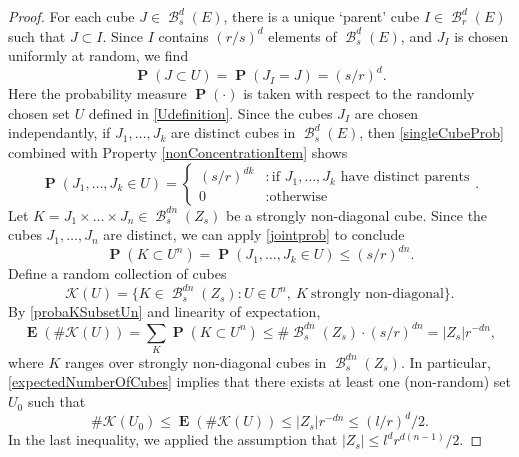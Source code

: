 \documentclass[dvipsnames,letterpaper,12pt]{article}
\numberwithin{equation}{section}
\theoremstyle{plain}
\DeclareMathOperator{\Prob}{\mathbf{P}}
\DeclareMathOperator{\Expect}{\mathbf{E}}
\DeclareMathOperator{\B}{\mathcal{B}}
\begin{document}
\begin{proof}
	For each cube $J \in \B_s^d(E)$, there is a unique `parent' cube $I \in \B_r^d(E)$ such that $J \subset I$. Since $I$ contains $(r/s)^d$ elements of $\B^d_s(E)$, and $J_I$ is chosen uniformly at random, we find
	\begin{equation} \label{singleCubeProb}
		\Prob(J \subset U) = \Prob(J_I = J) = (s/r)^d.
	\end{equation}
	Here the probability measure $\Prob(\cdot)$ is taken with respect to the randomly chosen set $U$ defined in \eqref{Udefinition}. Since the cubes $J_I$ are chosen independantly, if $J_1, \dots, J_k$ are distinct cubes in $\B^d_s(E)$, then \eqref{singleCubeProb} combined with Property \ref{nonConcentrationItem} shows
	\begin{equation}\label{jointprob}
		\Prob(J_1, \dots, J_k \in U) = \begin{cases} (s/r)^{dk} &: \text{if $J_1, \dots, J_k$ have distinct parents} \\ 0 &: \text{otherwise} \end{cases}.
	\end{equation}
	Let $K = J_1 \times \dots \times J_n \in \B^{dn}_s(Z_s)$ be a strongly non-diagonal cube. Since the cubes $J_1, \dots, J_n$ are distinct, we can apply \eqref{jointprob} to conclude
	\begin{equation}\label{probaKSubsetUn}
		\Prob(K \subset U^n) = \Prob(J_1, \dots, J_k \in U) \leq (s/r)^{dn}.
	\end{equation}
	Define a random collection of cubes
	\begin{equation}\label{KUDef}
		\mathcal{K}(U)=\{ K \in \B_s^{dn}(Z_s) \colon U\in U^n,\ K\ \textrm{strongly non-diagonal}  \}.
	\end{equation}
	By \eqref{probaKSubsetUn} and linearity of expectation,
	\begin{equation}\label{expectedNumberOfCubes}
		\Expect(\# \mathcal{K}(U)) = \sum_K \Prob(K \subset U^n) \leq \# \B_s^{dn}(Z_s) \cdot (s/r)^{dn} = |Z_s| r^{-dn},
	\end{equation}
	where $K$ ranges over strongly non-diagonal cubes in $\B^{dn}_s(Z_s)$. In particular, \eqref{expectedNumberOfCubes} implies that there exists at least one (non-random) set $U_0$ such that
	\begin{equation}\label{KU0Small}
		\# \mathcal{K}(U_0) \leq \Expect(\# \mathcal{K}(U)) \leq |Z_s| r^{-dn} \leq (l/r)^d/2.
	\end{equation}
	In the last inequality, we applied the assumption that $|Z_s| \leq l^d r^{d(n-1)}/2$.


\end{proof}
\end{document}
